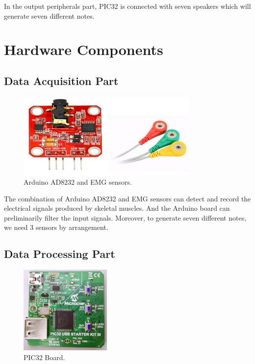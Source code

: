 \documentclass[12pt]{article}
\begin{document}
In the output peripherals part, PIC32 is connected with seven speakers which will generate seven different notes.


\section{Hardware Components}
\subsection{Data Acquisition Part}

\begin{figure}[H]
\centering
\includegraphics[width=0.8\textwidth]{sensor.png}
\caption{Arduino AD8232 and EMG sensors.}
\end{figure}

The combination of Arduino AD8232 and EMG sensors can detect and record the electrical signals produced by skeletal muscles. And the Arduino board can preliminarily filter the input signals. Moreover, to generate seven different notes, we need 3 sensors by arrangement.

\subsection{Data Processing Part}

\begin{figure}[H]
\centering
\includegraphics[width=0.4\textwidth]{pic32.png}
\caption{PIC32 Board.}
\end{figure}
\end{document}
